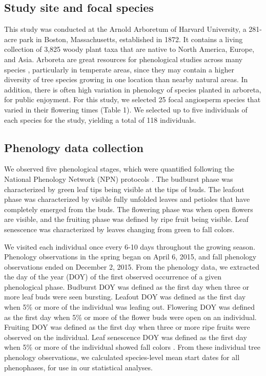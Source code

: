 \documentclass{article}
\begin{document}
\subsection*{Study site and focal species}
This study was conducted at the Arnold Arboretum of Harvard University, a 281-acre park in Boston, Massachusetts, established in 1872. It contains a living collection of 3,825 woody plant taxa that are native to North America, Europe, and Asia. Arboreta are great resources for phenological studies across many species \citep [e.g., ][]{primack2009a}, particularly in temperate areas, since they may contain a higher diversity of tree species growing in one location than nearby natural areas. In addition, there is often high variation in phenology of species planted in arboreta, for public enjoyment. For this study, we selected 25 focal angiosperm species that varied in their flowering times (Table 1). We selected up to five individuals of each species for the study, yielding a total of 118 individuals.

\subsection*{Phenology data collection}
We observed five phenological stages, which were quantified following the National Phenology Network (NPN) protocols \citep[for a full description see][]{denny2014}. The budburst phase was characterized by green leaf tips being visible at the tips of buds. The leafout phase was characterized by visible fully unfolded leaves and petioles that have completely emerged from the buds. The flowering phase was when open flowers are visible, and the fruiting phase was defined by ripe fruit being visible. Leaf senescence was characterized by leaves changing from green to fall colors. 
\par We visited each individual once every 6-10 days throughout the growing season. Phenology observations in the spring began on April 6, 2015, and fall phenology observations ended on December 2, 2015.
From the phenology data, we extracted the day of the year (DOY) of the first observed occurrence of a given phenological phase. Budburst DOY was defined as the first day when three or more leaf buds were seen bursting. Leafout DOY was defined as the first day when 5\% or more of the individual was leafing out. Flowering DOY was defined as the first day when 5\% or more of the flower buds were open on an individual. Fruiting DOY was defined as the first day when three or more ripe fruits were observed on the individual. Leaf senescence DOY was defined as the first day when 5\% or more of the individual showed fall colors \citep{denny2014}. 
From these individual tree phenology observations, we calculated species-level mean start dates for all phenophases, for use in our statistical analyses. 
\end{document}
